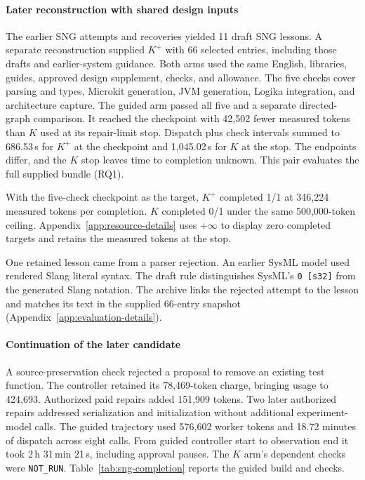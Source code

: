 \paragraph{Later reconstruction with shared design inputs}
The earlier SNG attempts and recoveries yielded 11 draft SNG lessons. A separate reconstruction supplied $K^{+}$ with 66 selected entries, including those drafts and earlier-system guidance. Both arms used the same English, libraries, guides, approved design supplement, checks, and allowance. The five checks cover parsing and types, Microkit generation, JVM generation, Logika integration, and architecture capture. The guided arm passed all five and a separate directed-graph comparison. It reached the checkpoint with 42,502 fewer measured tokens than $K$ used at its repair-limit stop. Dispatch plus check intervals summed to 686.53\,s for $K^{+}$ at the checkpoint and 1,045.02\,s for $K$ at the stop. The endpoints differ, and the $K$ stop leaves time to completion unknown. This pair evaluates the full supplied bundle (RQ1).

With the five-check checkpoint as the target, $K^{+}$ completed 1/1 at 346,224 measured tokens per completion. $K$ completed 0/1 under the same 500,000-token ceiling. Appendix~\ref{app:resource-details} uses $+\infty$ to display zero completed targets and retains the measured tokens at the stop.

One retained lesson came from a parser rejection. An earlier SysML model used rendered Slang literal syntax. The draft rule distinguishes SysML's \texttt{0 [s32]} from the generated Slang notation. The archive links the rejected attempt to the lesson and matches its text in the supplied 66-entry snapshot (Appendix~\ref{app:evaluation-details}).

\paragraph{Continuation of the later candidate}
A source-preservation check rejected a proposal to remove an existing test function. The controller retained its 78,469-token charge, bringing usage to 424,693. Authorized paid repairs added 151,909 tokens. Two later authorized repairs addressed serialization and initialization without additional experiment-model calls. The guided trajectory used 576,602 worker tokens and 18.72 minutes of dispatch across eight calls. From guided controller start to observation end it took 2\,h 31\,min 21\,s, including approval pauses. The $K$ arm's dependent checks were \texttt{NOT\_RUN}. Table~\ref{tab:sng-completion} reports the guided build and checks.

